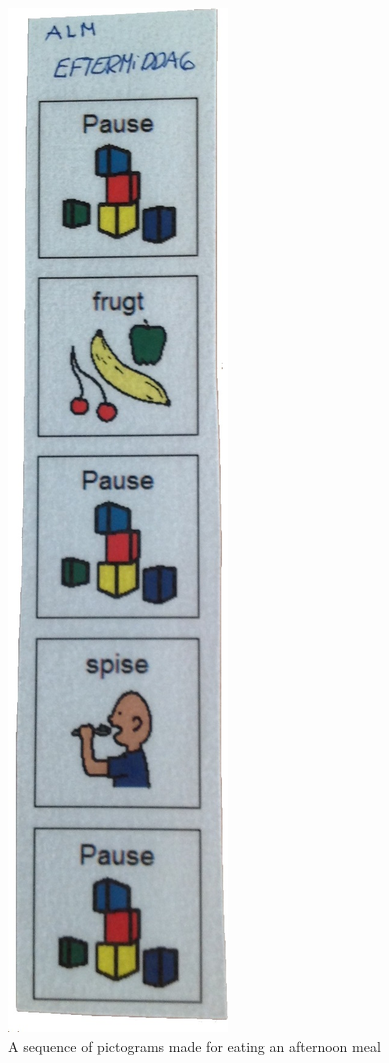 \begin{figure}
\begin{minipage}{.3\textwidth}
\includegraphics[scale=0.17]{Pics/Sprint1/pictogram_sequence.jpg}
\caption{A sequence of pictograms made for eating an afternoon meal}
\label{fig:sequence}
\end{minipage}
\end{figure}

